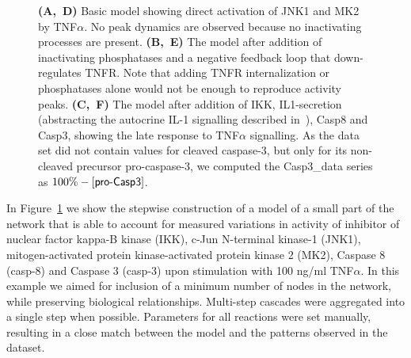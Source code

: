 \documentclass{bmcart}
\begin{document}
\begin{figure}[!htbp]
{{\bf(A,~D)} %
Basic model showing direct activation of JNK1 and MK2 by TNF$\alpha$.
No peak dynamics are observed because no inactivating processes are present.
{\bf(B,~E)} %
The model after addition of inactivating phosphatases and a negative feedback loop that down-regulates TNFR. Note that adding TNFR internalization or phosphatases alone would not be enough to reproduce activity peaks.
{\bf(C,~F)} %
The model after addition of IKK, IL1-secretion (abstracting
the autocrine IL-1 signalling described in~\cite{pathway-autocrine}), Casp8 and Casp3, showing the late response to TNF$\alpha$ signalling.
As the data set did not contain values for cleaved caspase-3, but only for its non-cleaved precursor pro-caspase-3,
we computed the {\sf Casp3\_{}data} series as $100\% - [\mbox{\sf pro-Casp3}]$.\label{fig:small-model}}
\end{figure}


In Figure~\ref{fig:small-model} we show the stepwise construction of a model of a small part of the network that is
able to account for measured variations in activity of inhibitor of nuclear factor kappa-B kinase (IKK), c-Jun N-terminal kinase-1 (JNK1),
mitogen-activated protein kinase-activated protein kinase 2 (MK2), Caspase 8 (casp-8) and Caspase 3 (casp-3) upon stimulation with 100
ng/ml TNF$\alpha$. In this example we aimed for inclusion of a minimum number of nodes in the network, while preserving biological relationships.
Multi-step cascades were aggregated into a single step when possible. Parameters for all reactions were set manually, resulting in a close
match between the model and the patterns observed in the dataset.











\end{document}
